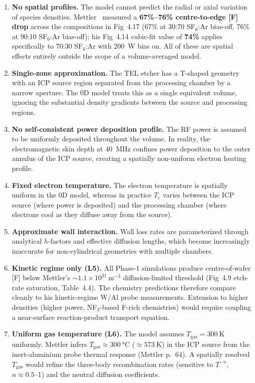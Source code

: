 \documentclass[11pt,a4paper]{report}
\newcommand{\Te}{T_e}
\begin{document}
\begin{enumerate}
\item \textbf{No spatial profiles.}  The model cannot predict the radial or axial variation of species densities.  Mettler~\cite{Mettler2025} measured a \textbf{67\%--76\% centre-to-edge [F] drop} across the compositions in Fig~4.17 (67\% at 30:70 SF$_6$:Ar bias-off, 76\% at 90:10 SF$_6$:Ar bias-off); his Fig~4.14 cubic-fit value of \textbf{74\%} applies specifically to 70:30 SF$_6$:Ar with \SI{200}{\watt} bias on.  All of these are spatial effects entirely outside the scope of a volume-averaged model.

\item \textbf{Single-zone approximation.}  The TEL etcher has a T-shaped geometry with an ICP source region separated from the processing chamber by a narrow aperture.  The 0D model treats this as a single equivalent volume, ignoring the substantial density gradients between the source and processing regions.

\item \textbf{No self-consistent power deposition profile.}  The RF power is assumed to be uniformly deposited throughout the volume.  In reality, the electromagnetic skin depth at \SI{40}{\mega\hertz} confines power deposition to the outer annulus of the ICP source, creating a spatially non-uniform electron heating profile.

\item \textbf{Fixed electron temperature.}  The electron temperature is spatially uniform in the 0D model, whereas in practice $\Te$ varies between the ICP source (where power is deposited) and the processing chamber (where electrons cool as they diffuse away from the source).

\item \textbf{Approximate wall interaction.}  Wall loss rates are parameterized through analytical $h$-factors and effective diffusion lengths, which become increasingly inaccurate for non-cylindrical geometries with multiple chambers.

\item \textbf{Kinetic regime only (L5).}  All Phase-1 simulations produce centre-of-wafer [F] below Mettler's $\sim 1.1\times10^{21}$\,m$^{-3}$ diffusion-limited threshold (Fig~4.9 etch-rate saturation, Table~4.4).  The chemistry predictions therefore compare cleanly to his kinetic-regime W/Al probe measurements.  Extension to higher densities (higher power, NF$_3$-based F-rich chemistries) would require coupling a near-surface reaction-product transport equation.

\item \textbf{Uniform gas temperature (L6).}  The model assumes $T_{\mathrm{gas}} = \SI{300}{\kelvin}$ uniformly.  Mettler infers $T_{\mathrm{gas}} \approx \SI{300}{\celsius}$ ($\approx \SI{573}{\kelvin}$) in the ICP source from the inert-aluminium probe thermal response (Mettler p.~64).  A spatially resolved $T_{\mathrm{gas}}$ would refine the three-body recombination rates (sensitive to $T^{-n}$, $n \approx 0.5$--1) and the neutral diffusion coefficients.
\end{enumerate}
\end{document}

